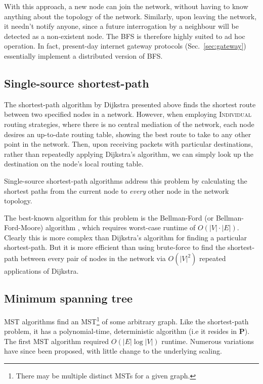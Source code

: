 \documentclass[aps, rmp, twocolumn, amsmath, amssymb, nofootinbib, superscriptaddress, longbibliography, floatfix, table-of-contents, eqsecnum]{revtex4-1}
\begin{document}
With this approach, a new node can join the network, without having to know anything about the topology of the network. Similarly, upon leaving the network, it needn't notify anyone, since a future interrogation by a neighbour will be detected as a non-existent node. The BFS is therefore highly suited to ad hoc operation. In fact, present-day internet gateway protocols (Sec.~\ref{sec:gateway}) essentially implement a distributed version of BFS.

%
%

\subsection{Single-source shortest-path} \label{sec:single_source_sp} 

The shortest-path algorithm by Dijkstra presented above finds the shortest route between two specified nodes in a network. However, when employing \textsc{Individual} routing strategies, where there is no central mediation of the network, each node desires an up-to-date routing table, showing the best route to take to any other point in the network. Then, upon receiving packets with particular destinations, rather than repeatedly applying Dijkstra's algorithm, we can simply look up the destination on the node's local routing table.

Single-source shortest-path algorithms address this problem by calculating the shortest paths from the current node to \textit{every} other node in the network topology.

The best-known algorithm for this problem is the Bellman-Ford (or Bellman-Ford-Moore) algorithm \cite{BF}, which requires worst-case runtime of $O(|V|\cdot |E|)$. Clearly this is more complex than Dijkstra's algorithm for finding a particular shortest-path. But it is more efficient than using brute-force to find the shortest-path between every pair of nodes in the network via $O(|V|^2)$ repeated applications of Dijkstra.

%
%

\subsection{Minimum spanning tree} \label{sec:min_tree} 

MST algorithms find an MST\footnote{There may be multiple distinct MSTs for a given graph.} of some arbitrary graph. Like the shortest-path problem, it has a polynomial-time, deterministic algorithm (i.e it resides in \textbf{P}). The first MST algorithm \cite{bib:Boruvka26} required $O(|E|\log |V|)$ runtime. Numerous variations have since been proposed, with little change to the underlying scaling.
\end{document}
